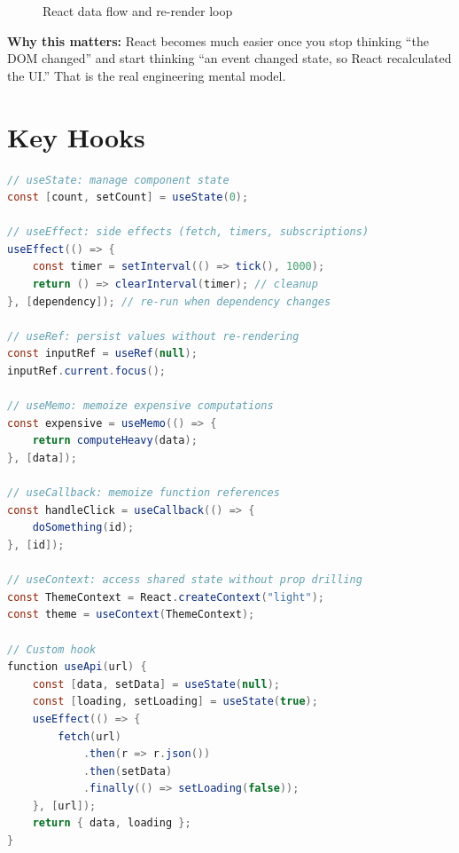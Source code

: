 \documentclass[12pt, a4paper, oneside]{book}
\begin{document}
\begin{figure}[H]
\centering
{}
\caption{React data flow and re-render loop}
\label{fig:react-data-flow}
\end{figure}

\textbf{Why this matters:} React becomes much easier once you stop thinking ``the DOM changed'' and start thinking ``an event changed state, so React recalculated the UI.'' That is the real engineering mental model.

\section{Key Hooks}

\begin{lstlisting}[language=Java, caption={React hooks}]
// useState: manage component state
const [count, setCount] = useState(0);

// useEffect: side effects (fetch, timers, subscriptions)
useEffect(() => {
    const timer = setInterval(() => tick(), 1000);
    return () => clearInterval(timer); // cleanup
}, [dependency]); // re-run when dependency changes

// useRef: persist values without re-rendering
const inputRef = useRef(null);
inputRef.current.focus();

// useMemo: memoize expensive computations
const expensive = useMemo(() => {
    return computeHeavy(data);
}, [data]);

// useCallback: memoize function references
const handleClick = useCallback(() => {
    doSomething(id);
}, [id]);

// useContext: access shared state without prop drilling
const ThemeContext = React.createContext("light");
const theme = useContext(ThemeContext);

// Custom hook
function useApi(url) {
    const [data, setData] = useState(null);
    const [loading, setLoading] = useState(true);
    useEffect(() => {
        fetch(url)
            .then(r => r.json())
            .then(setData)
            .finally(() => setLoading(false));
    }, [url]);
    return { data, loading };
}
\end{lstlisting}
\end{document}
